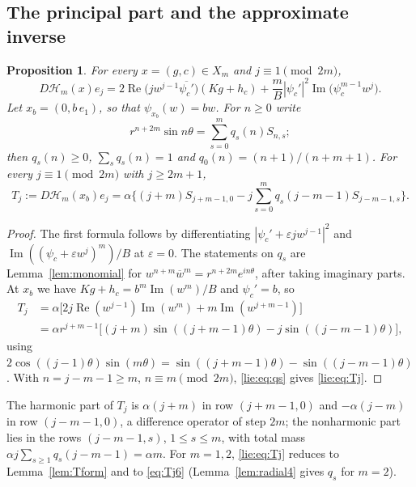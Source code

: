 \documentclass[11pt]{amsart}
\newtheorem{proposition}[theorem]{Proposition}
\theoremstyle{definition}
\theoremstyle{remark}
\numberwithin{equation}{section}
\newcommand{\eps}{\varepsilon}
\newcommand{\bw}{\overline{w}}
\DeclareMathOperator{\re}{Re}
\DeclareMathOperator{\im}{Im}
\newcommand{\Hc}{\mathcal{H}}
\begin{document}
\subsection{The principal part and the approximate inverse}\label{lie:subsec:inverse}

\begin{proposition}\label{lie:prop:principal}
For every $x=(g,c)\in X_m$ and $j\equiv1\pmod{2m}$,
\[
D\Hc_m(x)e_j=2\re\big(jw^{j-1}\overline{\psi_c'}\big)(Kg+h_c)+\frac mB|\psi_c'|^2\im\big(\psi_c^{m-1}w^j\big).
\]
Let $x_b=(0,b\,e_1)$, so that $\psi_{x_b}(w)=bw$. For $n\geq0$ write
\begin{equation}\label{lie:eq:qs}
r^{n+2m}\sin n\theta=\sum_{s=0}^mq_s(n)S_{n,s};
\end{equation}
then $q_s(n)\geq0$, $\sum_sq_s(n)=1$ and $q_0(n)=(n+1)/(n+m+1)$. For every $j\equiv1\pmod{2m}$ with $j\geq2m+1$,
\begin{equation}\label{lie:eq:Tj}
T_j:=D\Hc_m(x_b)e_j=\alpha\Big\{(j+m)S_{j+m-1,0}-j\sum_{s=0}^mq_s(j-m-1)S_{j-m-1,s}\Big\}.
\end{equation}
\end{proposition}

\begin{proof}
The first formula follows by differentiating $|\psi_c'+\eps jw^{j-1}|^2$ and $\im((\psi_c+\eps w^j)^m)/B$ at $\eps=0$. The statements on $q_s$ are Lemma~\ref{lem:monomial} for $w^{n+m}\bw^m=r^{n+2m}e^{in\theta}$, after taking imaginary parts. At $x_b$ we have $Kg+h_c=b^m\im(w^m)/B$ and $\psi_c'=b$, so
\begin{align*}
T_j&=\alpha\big[2j\re(w^{j-1})\im(w^m)+m\im(w^{j+m-1})\big]\\
&=\alpha r^{j+m-1}\big[(j+m)\sin((j+m-1)\theta)-j\sin((j-m-1)\theta)\big],
\end{align*}
using $2\cos((j-1)\theta)\sin(m\theta)=\sin((j+m-1)\theta)-\sin((j-m-1)\theta)$. With $n=j-m-1\geq m$, $n\equiv m\pmod{2m}$, \eqref{lie:eq:qs} gives \eqref{lie:eq:Tj}.
\end{proof}

The harmonic part of $T_j$ is $\alpha(j+m)$ in row $(j+m-1,0)$ and $-\alpha(j-m)$ in row $(j-m-1,0)$, a difference operator of step $2m$; the nonharmonic part lies in the rows $(j-m-1,s)$, $1\leq s\leq m$, with total mass $\alpha j\sum_{s\geq1}q_s(j-m-1)=\alpha m$. For $m=1,2$, \eqref{lie:eq:Tj} reduces to Lemma~\ref{lem:Tform} and to \eqref{eq:Tj6} (Lemma~\ref{lem:radial4} gives $q_s$ for $m=2$).
\end{document}
